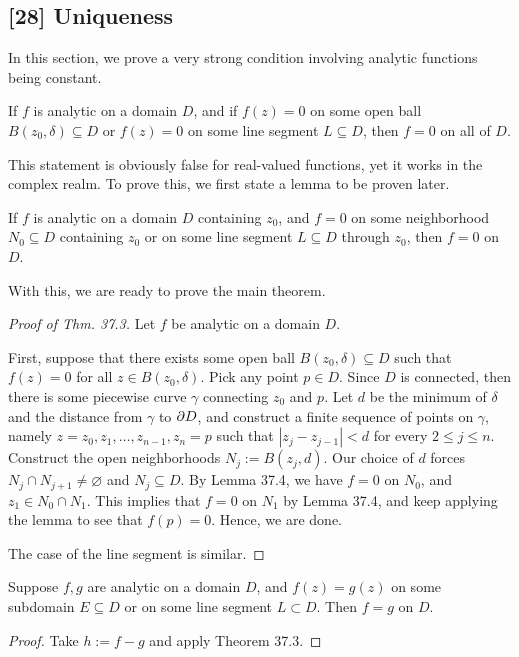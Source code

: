 \documentclass{article}
\begin{document}
\subsection*{[28] Uniqueness}
In this section, we prove a very strong condition involving analytic functions being constant.
\begin{theorem}
If $f$ is analytic on a domain $D$, and if $f(z) = 0$ on some open ball $B(z_0, \delta)\subseteq D$ or $f(z) = 0$ on some line segment $L\subseteq D$, then $f=  0$ on all of $D$.
\end{theorem}
This statement is obviously false for real-valued functions, yet it works in the complex realm. To prove this, we first state a lemma to be proven later.
\begin{lemma}
If $f$ is analytic on a domain $D$ containing $z_0$, and $f=0$ on some neighborhood $N_0\subseteq D$ containing $z_0$ or on some line segment $L\subseteq D$ through $z_0$, then $f= 0$ on $D$.
\end{lemma}
With this, we are ready to prove the main theorem. \newpage
\begin{proof}[Proof of Thm. 37.3]
Let $f$ be analytic on a domain $D$.

First, suppose that there exists some open ball $B(z_0, \delta)\subseteq D$ such that $f(z) = 0$ for all $z\in B(z_0, \delta)$. Pick any point $p\in D$. Since $D$ is connected, then there is some piecewise curve $\gamma$ connecting $z_0$ and $p$. Let $d$ be the minimum of $\delta$ and the distance from $\gamma$ to $\partial D$, and construct a finite sequence of points on $\gamma$, namely $z=  z_0, z_1, \ldots, z_{n-1}, z_n = p$ such that $|z_j - z_{j-1}| < d$ for every $2\leq j\leq n$. Construct the open neighborhoods $N_j := B(z_j, d)$. Our choice of $d$ forces $N_{j} \cap N_{j+1}\neq \varnothing$ and $N_j \subseteq D$. By Lemma 37.4, we have $f = 0$ on $N_0$, and $z_1 \in N_0\cap N_1$. This implies that $f= 0$ on $N_1$ by Lemma 37.4, and keep applying the lemma to see that $f(p) = 0$. Hence, we are done.

The case of the line segment is similar.
\end{proof}
\begin{corollary}
Suppose $f, g$ are analytic on a domain $D$, and $f(z) = g(z)$ on some subdomain $E\subseteq D$ or on some line segment $L\subset D$. Then $f=g$ on $D$.
\end{corollary}
\begin{proof}
Take $h := f-g$ and apply Theorem 37.3.
\end{proof}
\end{document}
